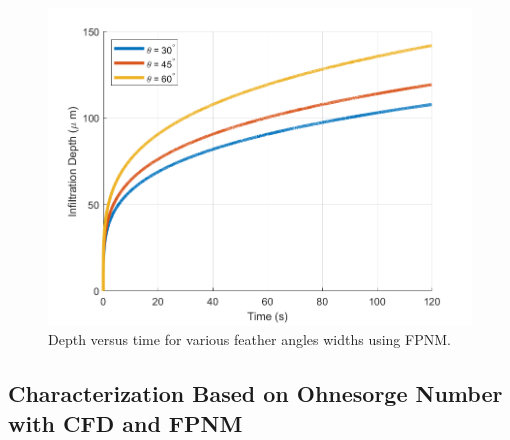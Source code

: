 \documentclass[%
 aip,
 amsmath,amssymb,
 reprint,%
floatfix]{revtex4-1}
\begin{document}
\begin{figure}
    \centering
    \includegraphics[width=\linewidth]{Figures/featherAngleStudy.png}
    \caption{Depth versus time for various feather angles widths using FPNM.}
    \label{fig:angleStudy}
\end{figure}

\subsection{Characterization Based on Ohnesorge Number with CFD and FPNM}
\end{document}
